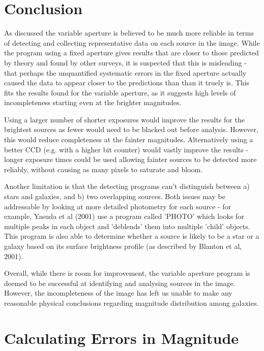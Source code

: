 \documentclass[a4paper,11pt,twoside]{article}
\begin{document}
\section{Conclusion}

As discussed the variable aperture is believed to be much 
more reliable in terms of detecting and collecting 
representative data on each source in the image. 
While the program using a fixed aperture gives results that are 
closer to those predicted by theory and found by other surveys, 
it is suspected that this is misleading - that perhaps 
the unquantified systematic errors in the fixed aperture actually 
caused the data to appear closer to the predictions than 
than it truely is. This fits the results found for the variable 
aperture, as it suggests high levels of incompleteness 
starting even at the brighter magnitudes.

Using a larger number of shorter exposures would improve 
the results for the brightest sources as fewer would need 
to be blacked out before analysis. However, this would reduce 
completeness at the fainter magnitudes.
Alternatively using a better CCD (e.g. with a higher bit counter) 
would vastly improve the results - longer exposure times 
could be used allowing fainter sources to be detected more 
reliably, without causing as many pixels to saturate and 
bloom.

Another limitation is that the detecting programs can't distinguish 
between a) stars and galaxies, and b) two overlapping sources. 
Both issues may be addressable by looking at more detailed photometry 
for each source - for example, Yasuda et al (2001)\cite{yasuda} use a 
program called 'PHOTO' which looks for multiple peaks in each object 
and 'deblends' them into multiple 'child' objects. This program is also 
able to determine whether a source is likely to be a star or 
a galaxy based on its surface brightness profile 
(as described by Blanton et al, 2001\cite{blanton}).

Overall, while there is room for improvement, the variable 
aperture program is deemed to be successful at identifying
and analysing sources in the image. However, the incompleteness 
of the image has left us unable to make any reasonable physical 
conclusions regarding magnitude distribution among galaxies.

\appendix

\section{Calculating Errors in Magnitude}
\end{document}
